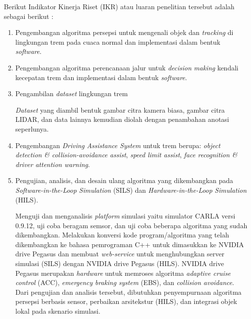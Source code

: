 Berikut Indikator Kinerja Riset (IKR)  atau luaran penelitian tersebut adalah
sebagai berikut \parencite{rispro-trilaksono}:
\begin{enumerate}
    \item Pengembangan algoritma persepsi untuk mengenali objek dan
    \textit{tracking} di lingkungan trem pada cuaca normal dan implementasi
    dalam bentuk \textit{software}.


    \item Pengembangan algoritma perencanaan jalur untuk \textit{decision
    making} kendali kecepatan trem dan implementasi dalam bentuk
    \textit{software}.


    \item Pengambilan \textit{dataset} lingkungan trem

    \textit{Dataset} yang diambil bentuk gambar citra kamera biasa, gambar citra
    LIDAR, dan data lainnya kemudian diolah dengan penambahan anotasi
    seperlunya.

    \item Pengembangan \textit{Driving Assistance System} untuk trem berupa:
    \textit{object detection & collision-avoidance assist},
    \textit{speed limit assist}, \textit{face recognition & driver
    attention warning}.

    \item Pengujian, analisis, dan desain ulang algoritma yang dikembangkan pada
    \textit{Software-in-the-Loop Simulation} (SILS) dan
    \textit{Hardware-in-the-Loop Simulation} (HILS).

    Menguji dan menganalisis \textit{platform} simulasi yaitu simulator CARLA
    versi 0.9.12, uji coba beragam semsor, dan uji coba beberapa algoritma yang
    sudah dikembangkan. Melakukan konversi kode program/algoritma yang telah
    dikembangkan ke bahasa pemrograman C++ untuk dimasukkan ke NVIDIA drive
    Pegasus dan membuat \textit{web-service} untuk menghubungkan server simulasi
    (SILS) dengan NVIDIA drive Pegasus (HILS). NVIDIA drive Pegasus merupakan
    \textit{hardware} untuk memroses algoritma  \textit{adaptive cruise control}
    (ACC), \textit{emergency braking system} (EBS), dan \textit{collision
    avoidance}. Dari pengujian dan analisis tersebut, dibutuhkan penyempurnaan
    algoritma persepsi berbasis sensor, perbaikan arsitekstur (HILS), dan
    integrasi objek lokal pada skenario simulasi.


\end{enumerate}

